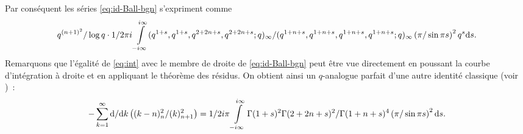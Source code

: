 \documentclass[12pt]{amsart}
\newcommand{\io}{\infty}
\newcommand{\dd}{\textup{d}}
\theoremstyle{remark}
\numberwithin{equation}{section}
\begin{document}
 Par cons{\'e}quent
les s{\'e}ries \eqref{eq:id-Ball-bgn} s'expriment comme
\begin{equation} \label{eq:int}
\frac{q^{(n+1)^2}}{\log q}\cdot
\frac{1}{2\pi i} \int\limits_{-i\io}^{i\io}
\frac
{(q^{1+s},q^{1+s},q^{2+2n+s},q^{2+2n+s}; q)_{\io}}
{(q^{1+n+s}, q^{1+n+s}, q^{1+n+s}, q^{1+n+s}; q)_{\io}}
\left(\frac{\pi}{\sin\pi s}\right)^2 q^s \dd s.
\end{equation}
Remarquons que l'{\'e}galit{\'e} de \eqref{eq:int} avec le membre de
droite de \eqref{eq:id-Ball-bgn} peut {\^e}tre vue directement
en poussant la courbe d'int{\'e}gration {\`a} droite et 
en appliquant le th{\'e}or{\`e}me des r{\'e}sidus.  
On obtient ainsi un $q$-analogue parfait 
d'une autre identit{\'e} classique (voir \cite{ne2})~:
\begin{equation*} 
-\sum_{k=1}^{\io}\frac{\dd }{\dd k}\left(\frac{(k-n)_n^2}{(k)_{n+1}^2}\right)
= \frac{1}{2i \pi}\int\limits_{-i\io}^{i\io}
\frac
{\Gamma(1+s)^2\Gamma(2+2n+s)^2}
{\Gamma(1+n+s)^4}
\left(\frac{\pi}{\sin\pi s}\right)^2 \dd s.
\end{equation*}
\end{document}
